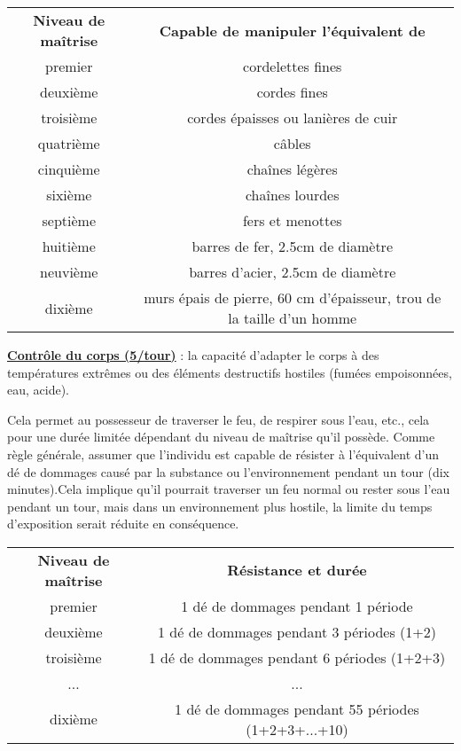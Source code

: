 \bigskip

\begin{tabular}{cc}
\textbf{Niveau de maîtrise} & \textbf{Capable de manipuler l'équivalent de} \\
premier    & cordelettes fines \\
deuxième   & cordes fines \\
troisième  & cordes épaisses ou lanières de cuir\\
quatrième  & câbles \\
cinquième  & chaînes légères \\
sixième    & chaînes lourdes \\
septième   & fers et menottes\\
huitième   & barres de fer, 2.5cm de diamètre\\
neuvième   & barres d'acier, 2.5cm de diamètre \\
dixième    & murs épais de pierre, 60 cm d'épaisseur, trou de la taille d'un homme \\
\end{tabular}

\bigskip

\label{guerrier-controle-corps}\textbf{\uline{Contrôle du corps (5/tour)}} : la capacité d'adapter le corps à des températures extrêmes ou des éléments destructifs hostiles (fumées empoisonnées, eau, acide).

\bigskip

Cela permet au possesseur de traverser le feu, de respirer sous l'eau, etc., cela pour une durée limitée dépendant du niveau de maîtrise qu'il possède. Comme règle générale, assumer que l'individu est capable de résister à l'équivalent d'un dé de dommages causé par la substance ou l'environnement pendant un tour (dix minutes).Cela implique qu'il pourrait traverser un feu normal ou rester sous l'eau pendant un tour, mais dans un environnement plus hostile, la limite du temps d'exposition serait réduite en conséquence.

\bigskip

\begin{tabular}{cc}
\textbf{Niveau de maîtrise} & \textbf{Résistance et durée} \\
premier     & 1 dé de dommages pendant 1 période \\
deuxième    & 1 dé de dommages pendant 3 périodes (1+2) \\
troisième   & 1 dé de dommages pendant 6 périodes (1+2+3) \\
...         & ... \\
dixième     & 1 dé de dommages pendant 55 périodes (1+2+3+...+10) \\
\end{tabular}

